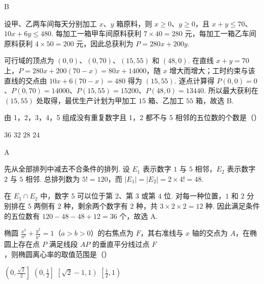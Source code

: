\begin{answer}
B
\end{answer}

\begin{solution}
设甲、乙两车间每天分别加工 \(x\)、\(y\) 箱原料，则 \(x\geq0\)、\(y\geq0\)，且 \(x+y\leq70\)、\(10x+6y\leq480\). 每加工一箱甲车间原料获利 \(7\times40=280\) 元，每加工一箱乙车间原料获利 \(4\times50=200\) 元，因此总获利为 \(P=280x+200y\).

可行域的顶点为 \((0,0)\)、\((0,70)\)、\((15,55)\) 和 \((48,0)\). 在直线 \(x+y=70\) 上，\(P=280x+200(70-x)=80x+14000\)，随 \(x\) 增大而增大；工时约束与该直线的交点由 \(10x+6(70-x)=480\) 得为 \((15,55)\). 逐点计算得
\(P(0,0)=0\)、\(P(0,70)=14000\)、\(P(15,55)=15200\)、\(P(48,0)=13440\). 所以最大获利在 \((15,55)\) 处取得，最优生产计划为甲加工 \(15\) 箱、乙加工 \(55\) 箱，故选 B.
\end{solution}

\begin{problem}
由 1，2，3，4，5 组成没有重复数字且 1，2 都不与 5 相邻的五位数的个数是（\quad）

\choices
    {\(36\)}
    {\(32\)}
    {\(28\)}
    {\(24\)}
\end{problem}

\begin{answer}
A
\end{answer}

\begin{solution}
先从全部排列中减去不合条件的排列. 设 \(E_1\) 表示数字 \(1\) 与 \(5\) 相邻，\(E_2\) 表示数字 \(2\) 与 \(5\) 相邻. 总排列数为 \(5!=120\)，而 \(|E_1|=|E_2|=2\times4!=48\).

在 \(E_1\cap E_2\) 中，数字 \(5\) 可以位于第 \(2\)、第 \(3\) 或第 \(4\) 位. 对每一种位置，\(1\) 和 \(2\) 分别排在 \(5\) 两侧有 \(2\) 种，剩余两个数字有 \(2\) 种，共 \(3\times2\times2=12\) 种. 因此满足条件的五位数有 \(120-48-48+12=36\) 个，故选 A.
\end{solution}

\begin{problem}
椭圆 \(\frac{x^2}{a^2} + \frac{y^2}{b^2} = 1\)（\(a > b > 0\)）的右焦点为 \(F\)，其右准线与 \(x\) 轴的交点为 \(A\)，在椭圆上存在点 \(P\) 满足线段 \(AP\) 的垂直平分线过点 \(F\)，则椭圆离心率的取值范围是（\quad）

\choices
    {\(\left(0, \frac{\sqrt{2}}{2}\right]\)}
    {\(\left(0, \frac{1}{2}\right]\)}
    {\(\left[\sqrt{2} - 1, 1\right)\)}
    {\(\left[\frac{1}{2}, 1\right)\)}
\end{problem}

